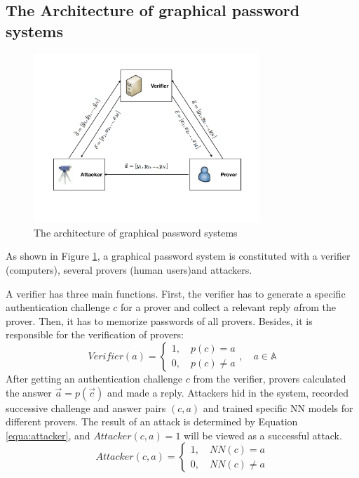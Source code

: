 \documentclass{article}
\begin{document}
  \subsection{The Architecture of graphical password systems}
  \begin{figure}[htb]
    \centering
    \includegraphics[width=8.5cm]{architecture.pdf}
    \caption{The architecture of graphical password systems}
    \label{fig:architecture}
  \end{figure}
  As shown in Figure \ref{fig:architecture}, a graphical password system is constituted with a verifier (computers), 
  several provers (human users)and attackers. 
  
  A verifier has three main functions. First, the verifier has to generate a specific authentication challenge $c$ for 
  a prover and collect a relevant reply $a$from the prover. Then, it has to memorize passwords of all provers. 
  Besides, it is responsible for the verification of provers:
  \begin{equation}
    Verifier(a)=
  \left\{
   \begin{aligned}
   1, \quad p(c) = a \\
   0, \quad p(c) \neq a
   \end{aligned}
   \right.
   , \quad a \in \mathbb{A}
  \end{equation}
  After getting an authentication challenge $c$ from the verifier, provers calculated the answer $\vec{a} = p(\vec{c})$ 
  and made a reply. Attackers hid in the system, recorded successive challenge and answer pairs $(c, a)$ and trained specific 
  NN models for different provers. The result of an attack is determined by Equation \ref{equa:attacker}, 
  and $Attacker(c,a)=1$ will be viewed as a successful attack.
  \begin{equation}
    Attacker(c, a)=
  \left\{
   \begin{aligned}
   1, \quad NN(c) = a \\
   0, \quad NN(c) \neq a
   \end{aligned}
   \right.
  \label{equa:attacker}
  \end{equation}
  
\end{document}
